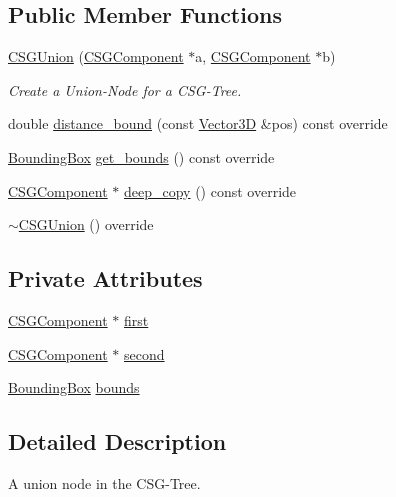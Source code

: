 \subsection*{Public Member Functions}
\begin{DoxyCompactItemize}
\item 
\hyperlink{classCSGUnion_a89f33aab1b6e073a2813f97cc3998fc7}{C\+S\+G\+Union} (\hyperlink{classCSGComponent}{C\+S\+G\+Component} $\ast$a, \hyperlink{classCSGComponent}{C\+S\+G\+Component} $\ast$b)
\begin{DoxyCompactList}\small\item\em Create a Union-\/\+Node for a C\+S\+G-\/\+Tree. \end{DoxyCompactList}\item 
double \hyperlink{classCSGUnion_a2a15937802a57a3a78b84961fc0dda9f}{distance\+\_\+bound} (const \hyperlink{classVector3D}{Vector3D} \&pos) const override
\item 
\hyperlink{classBoundingBox}{Bounding\+Box} \hyperlink{classCSGUnion_aaf1d2e77d8f931327fd8c499933142ba}{get\+\_\+bounds} () const override
\item 
\hyperlink{classCSGComponent}{C\+S\+G\+Component} $\ast$ \hyperlink{classCSGUnion_a806fa004753847d293e56a93112abe9a}{deep\+\_\+copy} () const override
\item 
\hyperlink{classCSGUnion_af16ab807f0e1140de88007a5606f2a91}{$\sim$\+C\+S\+G\+Union} () override
\end{DoxyCompactItemize}
\subsection*{Private Attributes}
\begin{DoxyCompactItemize}
\item 
\hyperlink{classCSGComponent}{C\+S\+G\+Component} $\ast$ \hyperlink{classCSGUnion_ac2042150362043f8646dc9f13e98df1a}{first}
\item 
\hyperlink{classCSGComponent}{C\+S\+G\+Component} $\ast$ \hyperlink{classCSGUnion_abb2099a585c204bdcf3c2d0c8004438e}{second}
\item 
\hyperlink{classBoundingBox}{Bounding\+Box} \hyperlink{classCSGUnion_a40b5e5f99930721873da62db801e0c90}{bounds}
\end{DoxyCompactItemize}


\subsection{Detailed Description}
A union node in the C\+S\+G-\/\+Tree. 

